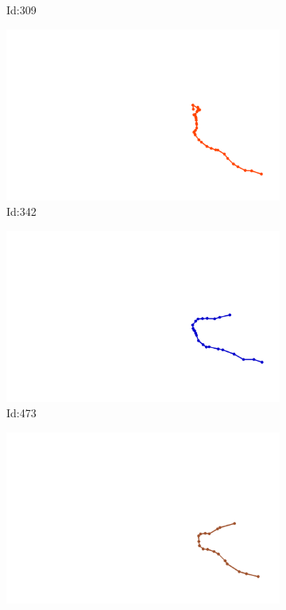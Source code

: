 \documentclass[12pt,twoside]{report}
\begin{document}
\begin{figure}
\begin{subfigure}[b]{0.20\textwidth}
\caption{Id:309}
\end{subfigure}
\begin{subfigure}[b]{0.20\textwidth}
\centering
\includegraphics[width=\textwidth]{../trajectories/342.png}
\caption{Id:342}
\end{subfigure}
\begin{subfigure}[b]{0.20\textwidth}
\centering
\includegraphics[width=\textwidth]{../trajectories/473.png}
\caption{Id:473}
\end{subfigure}
\begin{subfigure}[b]{0.20\textwidth}
\centering
\includegraphics[width=\textwidth]{../trajectories/579.png}

\end{subfigure}
\end{figure}
\end{document}
